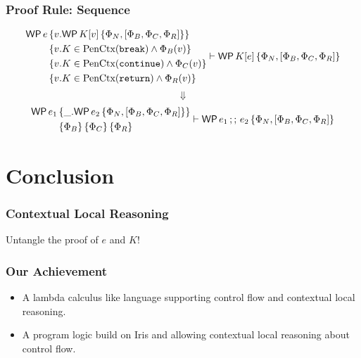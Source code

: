 \documentclass[10pt]{beamer}
\begin{document}
\begin{frame}
\frametitle{Proof Rule: Sequence}

$$
\begin{aligned}
  \WP\,e\,& \progspec{v. \wpre{K[v]}{\Phi_N}{\Phi_B}{\Phi_C}{\Phi_R}} \\
                  & \progspec{v. K \in \pure{\cmdbreak\!} \land \Phi_B(v)} \\
                  & \progspec{v. K \in \pure{\cmdcontinue} \land \Phi_C(v)} \\
                  & \progspec{v. K \in \pure{\cmdreturn\!} \land \Phi_R(v)}
\end{aligned} \vdash \wpre{K[e]}{\Phi_N}{\Phi_B}{\Phi_C}{\Phi_R}
$$
$$
\Downarrow
$$
$$
\begin{aligned}
  \WP\,e_1\,& \progspec{\_.\wpre{e_2}{\Phi_N}{\Phi_B}{\Phi_C}{\Phi_R}} \\
                  & \progspec{\Phi_B}\,\progspec{\Phi_C}\,\progspec{\Phi_R}
\end{aligned} \vdash \wpre{e_1 \cmdseq e_2}{\Phi_N}{\Phi_B}{\Phi_C}{\Phi_R}
$$

\end{frame}

\section{Conclusion}

\begin{frame}
\frametitle{Contextual Local Reasoning}
  
\begin{mathpar}
\end{mathpar}

\begin{center}
  Untangle the proof of $e$ and $K$!  
\end{center}
  
\end{frame}

\begin{frame}
\frametitle{Our Achievement}

\begin{itemize}
  \item A lambda calculus like language supporting control flow and contextual local reasoning.
  \item A program logic build on Iris and allowing contextual local reasoning about control flow.
\end{itemize}

\end{frame}
\end{document}
